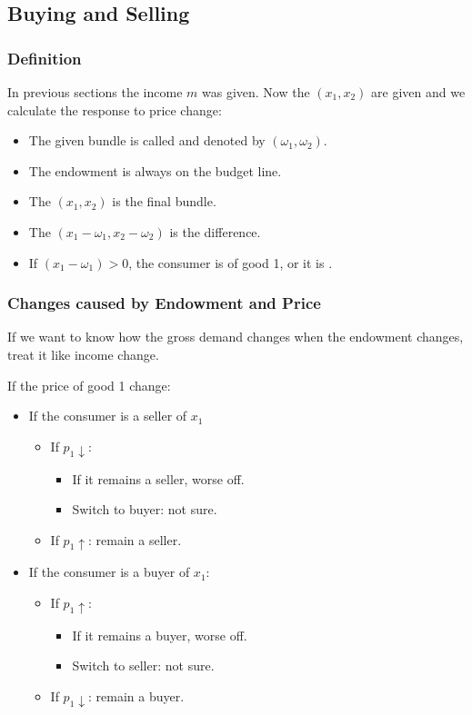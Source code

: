 \subsection{Buying and Selling}
\subsubsection{Definition}
In previous sections the income $m$ was given. Now the $(x_1,x_2)$ are given and we calculate the response to price change:
\begin{itemize}
    \item The given bundle is called  and denoted by $(\omega_1, \omega_2)$.
    \item The endowment is always on the budget line.
    \item The  $(x_1,x_2)$ is the final bundle.
    \item The  $(x_1-\omega_1,x_2 -\omega_2)$ is the difference.
    \item If $(x_1-\omega_1) > 0$, the consumer is  of good 1, or it is .
\end{itemize}


\subsubsection{Changes caused by Endowment and Price}
If we want to know how the gross demand changes when the endowment changes, treat it like income change. 

If the price of good 1 change:
\begin{itemize}
    \item If the consumer is a seller of $x_1$
        \begin{itemize}
            \item If $p_1 \downarrow$:
                \begin{itemize}
                    \item If it remains a seller, worse off.
                    \item Switch to buyer: not sure.
                \end{itemize}
            \item If $p_1 \uparrow$: remain a seller.
        \end{itemize}        
    \item If the consumer is a buyer of $x_1$:
        \begin{itemize}
            \item If $p_1 \uparrow$:
                \begin{itemize}
                    \item If it remains a buyer, worse off.
                    \item Switch to seller: not sure.
                \end{itemize}
            \item If $p_1 \downarrow$: remain a buyer. 
        \end{itemize}
\end{itemize}


